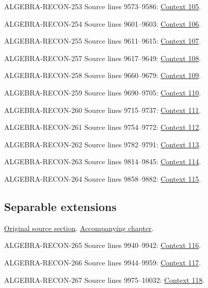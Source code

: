 \begin{AlgebraSourceRoutes}
\item[ALGEBRA-RECON-253] Source lines 9573--9586: \hyperlink{algebra-context-105}{Context 105}.
\item[ALGEBRA-RECON-254] Source lines 9601--9603: \hyperlink{algebra-context-106}{Context 106}.
\item[ALGEBRA-RECON-255] Source lines 9611--9615: \hyperlink{algebra-context-107}{Context 107}.
\item[ALGEBRA-RECON-257] Source lines 9617--9649: \hyperlink{algebra-context-108}{Context 108}.
\item[ALGEBRA-RECON-258] Source lines 9660--9679: \hyperlink{algebra-context-109}{Context 109}.
\item[ALGEBRA-RECON-259] Source lines 9690--9705: \hyperlink{algebra-context-110}{Context 110}.
\item[ALGEBRA-RECON-260] Source lines 9715--9737: \hyperlink{algebra-context-111}{Context 111}.
\item[ALGEBRA-RECON-261] Source lines 9754--9772: \hyperlink{algebra-context-112}{Context 112}.
\item[ALGEBRA-RECON-262] Source lines 9782--9791: \hyperlink{algebra-context-113}{Context 113}.
\item[ALGEBRA-RECON-263] Source lines 9814--9845: \hyperlink{algebra-context-114}{Context 114}.
\item[ALGEBRA-RECON-264] Source lines 9858--9882: \hyperlink{algebra-context-115}{Context 115}.
\end{AlgebraSourceRoutes}

\subsection{Separable extensions}
\hypertarget{algebra-source-section-separability}{}
\noindent\href{https://github.com/stacks/stacks-project/blob/a04446e57ec1fbc252a871afcec7752fb2807b14/algebra.tex\#L9906}{Original source section}. \href{algebra.pdf\#nameddest=section-separability}{Accompanying chapter}.

\begin{AlgebraSourceRoutes}
\item[ALGEBRA-RECON-265] Source lines 9940--9942: \hyperlink{algebra-context-116}{Context 116}.
\item[ALGEBRA-RECON-266] Source lines 9944--9959: \hyperlink{algebra-context-117}{Context 117}.
\item[ALGEBRA-RECON-267] Source lines 9975--10032: \hyperlink{algebra-context-118}{Context 118}.
\end{AlgebraSourceRoutes}

